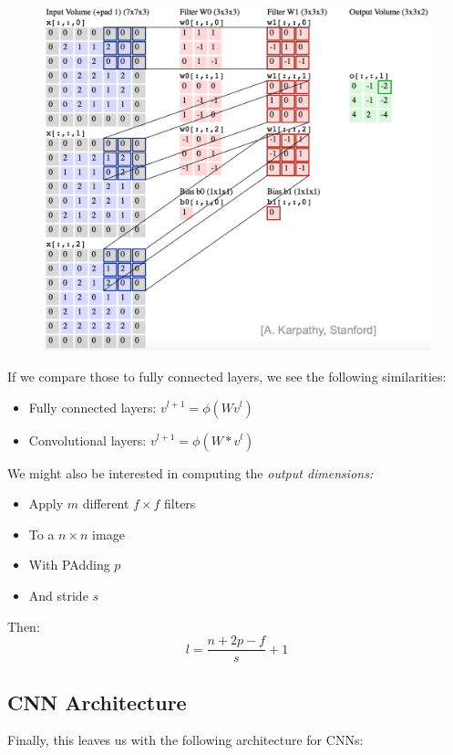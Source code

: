\documentclass[a4paper]{extarticle}
\begin{document}
\begin{figure}[H]
    \includegraphics[width=15cm]{../images/IntroML_Fig7-3}
    \centering
\end{figure}

If we compare those to fully connected layers, we see the following similarities:
\begin{itemize}
    \item Fully connected layers: $v^{l + 1} = \phi(Wv^l)$
    \item Convolutional layers: $v^{l + 1} = \phi(W * v^l)$
\end{itemize}

We might also be interested in computing the \textit{output dimensions:}
\begin{itemize}
    \item Apply $m$ different $f \times f$ filters
    \item To a $n \times n$ image
    \item With PAdding $p$
    \item And stride $s$
\end{itemize}
Then:
\[
    l = \frac{n + 2p - f}{s} + 1
\]

\subsection{CNN Architecture}

Finally, this leaves us with the following architecture for CNNs:
\end{document}
